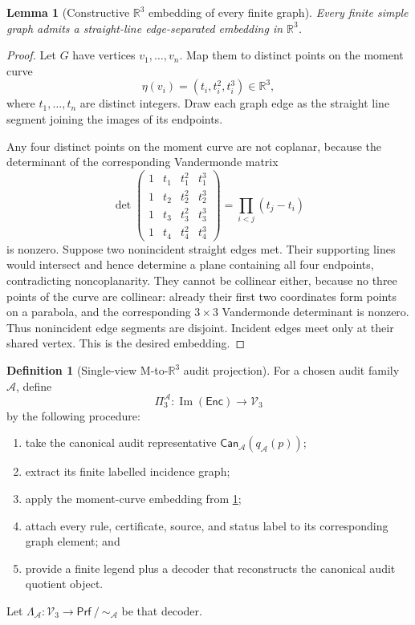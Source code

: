 \documentclass[11pt]{article}
\newcommand{\R}{\mathbb R}
\newcommand{\Prf}{\mathsf{Prf}}
\newcommand{\Enc}{\mathsf{Enc}}
\newcommand{\Can}{\mathsf{Can}}
\newcommand{\Img}{\operatorname{Im}}
\newcommand{\quot}{\mathbin{/}}
\newcommand{\eqA}{\mathrel{\sim_{\mathcal A}}}
\newcommand{\qA}{q_{\mathcal A}}
\newcommand{\mcA}{\mathcal A}
\newcommand{\mcV}{\mathcal V_3}
\theoremstyle{plain}
\newtheorem{lemma}[theorem]{Lemma}
\theoremstyle{definition}
\newtheorem{definition}[theorem]{Definition}
\theoremstyle{remark}
\begin{document}
\begin{lemma}[Constructive $\R^3$ embedding of every finite graph]
\label{lem:momentcurve}
Every finite simple graph admits a straight-line edge-separated embedding in $\R^3$.
\end{lemma}

\begin{proof}
Let $G$ have vertices $v_1,\ldots,v_n$.  Map them to distinct points on the moment curve
\[
  \eta(v_i)=(t_i,t_i^2,t_i^3)\in\R^3,
\]
where $t_1,\ldots,t_n$ are distinct integers.  Draw each graph edge as the straight line segment joining the images of its endpoints.

Any four distinct points on the moment curve are not coplanar, because the determinant of the corresponding Vandermonde matrix
\[
\det\begin{pmatrix}
1&t_1&t_1^2&t_1^3\\
1&t_2&t_2^2&t_2^3\\
1&t_3&t_3^2&t_3^3\\
1&t_4&t_4^2&t_4^3
\end{pmatrix}
=\prod_{i<j}(t_j-t_i)
\]
is nonzero.  Suppose two nonincident straight edges met.  Their supporting lines would intersect and hence determine a plane containing all four endpoints, contradicting noncoplanarity.  They cannot be collinear either, because no three points of the curve are collinear: already their first two coordinates form points on a parabola, and the corresponding $3\times 3$ Vandermonde determinant is nonzero.  Thus nonincident edge segments are disjoint.  Incident edges meet only at their shared vertex.  This is the desired embedding.
\end{proof}

\begin{definition}[Single-view M-to-$\R^3$ audit projection]
\label{def:projection}
For a chosen audit family $\mcA$, define
\[
  \Pi^{\mcA}_3:\Img(\Enc)\to\mcV
\]
by the following procedure:
\begin{enumerate}
    \item take the canonical audit representative $\Can_{\mcA}(\qA(p))$;
    \item extract its finite labelled incidence graph;
    \item apply the moment-curve embedding from \cref{lem:momentcurve};
    \item attach every rule, certificate, source, and status label to its corresponding graph element; and
    \item provide a finite legend plus a decoder that reconstructs the canonical audit quotient object.
\end{enumerate}
Let $\Lambda_{\mcA}:\mcV\to\Prf\quot\eqA$ be that decoder.
\end{definition}
\end{document}
